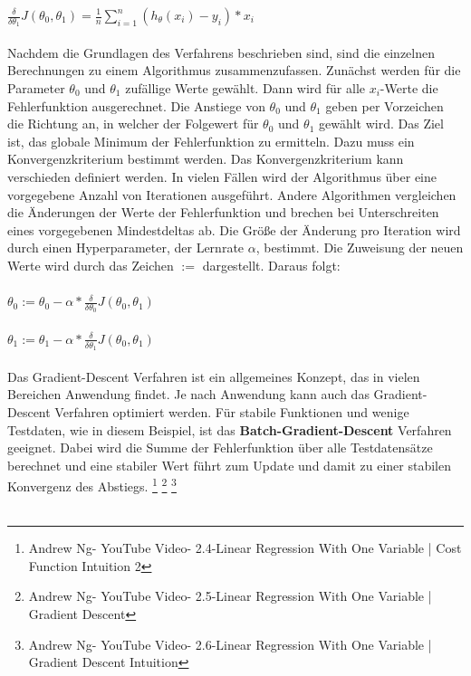 \documentclass[a4paper]{scrreprt}
\begin{document}
\begin{enumerate}
$\frac{\delta}{\delta \theta_{1}} J(\theta_{0},\theta_{1})= \frac{1}{n}\sum_{i=1}^{n} (h_{\theta} (x_i)-y_i)*x_i$\\\\
Nachdem die Grundlagen des Verfahrens beschrieben sind, sind die einzelnen Berechnungen zu einem Algorithmus zusammenzufassen. Zunächst werden für die Parameter $\theta_{0}$ und $\theta_{1}$ zufällige Werte gewählt. Dann wird für alle $x_i$-Werte die Fehlerfunktion ausgerechnet. Die Anstiege von $\theta_{0}$ und $\theta_{1}$ geben per Vorzeichen die Richtung an, in welcher der Folgewert für $\theta_{0}$ und $\theta_{1}$ gewählt wird. Das Ziel ist, das globale Minimum der Fehlerfunktion zu ermitteln. Dazu muss ein Konvergenzkriterium bestimmt werden. Das Konvergenzkriterium kann verschieden definiert werden. In vielen Fällen wird der Algorithmus über eine vorgegebene Anzahl von Iterationen ausgeführt. Andere Algorithmen vergleichen die Änderungen der Werte der Fehlerfunktion und brechen bei Unterschreiten eines vorgegebenen Mindestdeltas ab. Die Größe der Änderung pro Iteration wird durch einen Hyperparameter, der Lernrate $\alpha$, bestimmt. Die Zuweisung der neuen Werte wird durch das Zeichen $:=$ dargestellt. Daraus folgt:\\\\
$\theta_{0}:= \theta_{0} - \alpha * \frac{\delta}{\delta \theta_{0}} J(\theta_{0},\theta_{1})$\\\\
$\theta_{1}:= \theta_{1} - \alpha * \frac{\delta}{\delta \theta_{1}} J(\theta_{0},\theta_{1})$\\\\
Das Gradient-Descent Verfahren ist ein allgemeines Konzept, das in vielen Bereichen Anwendung findet. Je nach Anwendung kann auch das Gradient-Descent Verfahren optimiert werden. Für stabile Funktionen und wenige Testdaten, wie in diesem Beispiel, ist das \textbf{Batch-Gradient-Descent} Verfahren geeignet.\newpage
Dabei wird die Summe der Fehlerfunktion über alle Testdatensätze berechnet und eine stabiler Wert führt zum Update und damit zu einer stabilen Konvergenz des Abstiegs.
\footnote{Andrew Ng- YouTube Video- 2.4-Linear Regression With One Variable | Cost Function Intuition 2}
\footnote{Andrew Ng- YouTube Video- 2.5-Linear Regression With One Variable | Gradient Descent}
\footnote{Andrew Ng- YouTube Video- 2.6-Linear Regression With One Variable | Gradient Descent Intuition}
\\\\

\end{enumerate}
\end{document}
